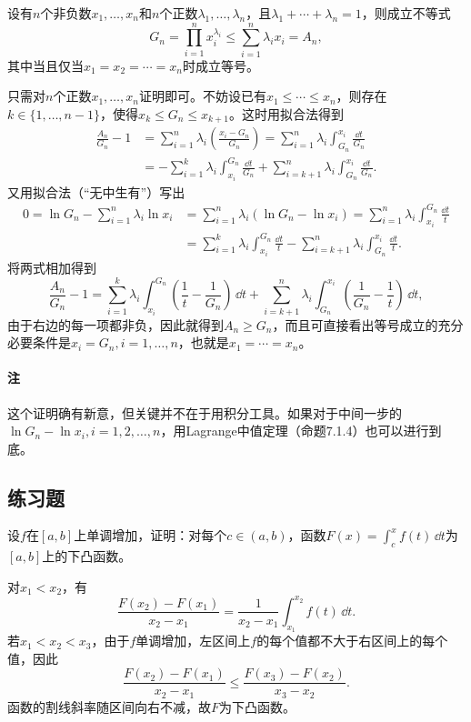 \begin{xexample}[11.2.6]
设有$n$个非负数$x_1,\ldots,x_n$和$n$个正数$\lambda_1,\ldots,\lambda_n$，且$\lambda_1+\cdots+\lambda_n=1$，则成立不等式
\begin{equation}
  G_n=\prod_{i=1}^nx_i^{\lambda_i}\le\sum_{i=1}^n\lambda_ix_i=A_n,
  \tag{11.16}
  \label{eq:11.16}
\end{equation}
其中当且仅当$x_1=x_2=\cdots=x_n$时成立等号。
\end{xexample}
\begin{xproof}
只需对$n$个正数$x_1,\ldots,x_n$证明即可。不妨设已有$x_1\le\cdots\le x_n$，则存在$k\in\{1,\ldots,n-1\}$，使得$x_k\le G_n\le x_{k+1}$。这时用拟合法得到
\begin{align*}
\frac{A_n}{G_n}-1
&=\sum_{i=1}^n\lambda_i\left(\frac{x_i-G_n}{G_n}\right)
 =\sum_{i=1}^n\lambda_i\int_{G_n}^{x_i}\frac{\dd t}{G_n}\\
&=-\sum_{i=1}^k\lambda_i\int_{x_i}^{G_n}\frac{\dd t}{G_n}
 +\sum_{i=k+1}^n\lambda_i\int_{G_n}^{x_i}\frac{\dd t}{G_n}.
\end{align*}
又用拟合法（“无中生有”）写出
\begin{align*}
0=\ln G_n-\sum_{i=1}^n\lambda_i\ln x_i
&=\sum_{i=1}^n\lambda_i(\ln G_n-\ln x_i)
 =\sum_{i=1}^n\lambda_i\int_{x_i}^{G_n}\frac{\dd t}{t}\\
&=\sum_{i=1}^k\lambda_i\int_{x_i}^{G_n}\frac{\dd t}{t}
 -\sum_{i=k+1}^n\lambda_i\int_{G_n}^{x_i}\frac{\dd t}{t}.
\end{align*}
将两式相加得到
\[
  \frac{A_n}{G_n}-1
  =\sum_{i=1}^k\lambda_i\int_{x_i}^{G_n}\left(\frac1t-\frac1{G_n}\right)\,\dd t
  +\sum_{i=k+1}^n\lambda_i\int_{G_n}^{x_i}\left(\frac1{G_n}-\frac1t\right)\,\dd t,
\]
由于右边的每一项都非负，因此就得到$A_n\ge G_n$，而且可直接看出等号成立的充分必要条件是$x_i=G_n,i=1,\ldots,n$，也就是$x_1=\cdots=x_n$。
\end{xproof}

\paragraph{注} 这个证明确有新意，但关键并不在于用积分工具。如果对于中间一步的$\ln G_n-\ln x_i,i=1,2,\ldots,n$，用Lagrange中值定理（命题7.1.4）也可以进行到底。

\subsection{练习题}

\begin{xexercise}[1]
设$f$在$[a,b]$上单调增加，证明：对每个$c\in(a,b)$，函数$F(x)=\int_c^xf(t)\,\dd t$为$[a,b]$上的下凸函数。
\end{xexercise}
\begin{xsolution}
对$x_1<x_2$，有
\[
 \frac{F(x_2)-F(x_1)}{x_2-x_1}
 =\frac1{x_2-x_1}\int_{x_1}^{x_2}f(t)\,\dd t.
\]
若$x_1<x_2<x_3$，由于$f$单调增加，左区间上$f$的每个值都不大于右区间上的每个值，因此
\[
 \frac{F(x_2)-F(x_1)}{x_2-x_1}
 \le
 \frac{F(x_3)-F(x_2)}{x_3-x_2}.
\]
函数的割线斜率随区间向右不减，故$F$为下凸函数。
\end{xsolution}


